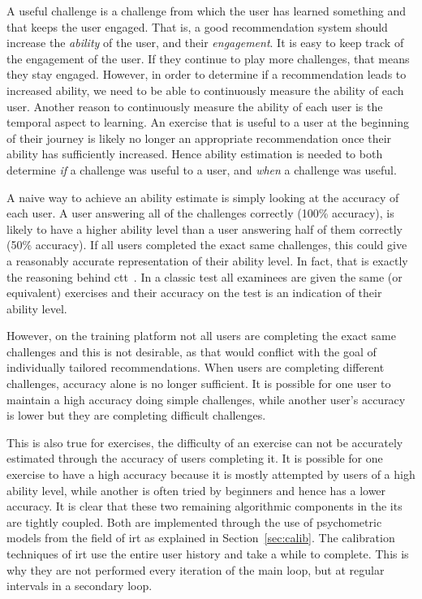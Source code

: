 A useful challenge is a challenge from which the user has learned something and that keeps the user engaged.
That is, a good recommendation system should increase the \textit{ability} of the user, and their \textit{engagement}.
It is easy to keep track of the engagement of the user.
If they continue to play more challenges, that means they stay engaged.
However, in order to determine if a recommendation leads to increased ability, we need to be able to continuously measure the ability of each user.
Another reason to continuously measure the ability of each user is the temporal aspect to learning.
An exercise that is useful to a user at the beginning of their journey is likely no longer an appropriate recommendation once their ability has sufficiently increased.
Hence ability estimation is needed to both determine \textit{if} a challenge was useful to a user, and \textit{when} a challenge was useful.

A naive way to achieve an ability estimate is simply looking at the accuracy of each user.
A user answering all of the challenges correctly (100\% accuracy), is likely to have a higher ability level than a user answering half of them correctly (50\% accuracy).
If all users completed the exact same challenges, this could give a reasonably accurate representation of their ability level.
In fact, that is exactly the reasoning behind \gls{ctt}~\cite{ctt}.
In a classic test all examinees are given the same (or equivalent) exercises and their accuracy on the test is an indication of their ability level.

However, on the training platform not all users are completing the exact same challenges and this is not desirable, as that would conflict with the goal of individually tailored recommendations.
When users are completing different challenges, accuracy alone is no longer sufficient.
It is possible for one user to maintain a high accuracy doing simple challenges, while another user's accuracy is lower but they are completing difficult challenges.

This is also true for exercises, the difficulty of an exercise can not be accurately estimated through the accuracy of users completing it.
It is possible for one exercise to have a high accuracy because it is mostly attempted by users of a high ability level, while another is often tried by beginners and hence has a lower accuracy.
It is clear that these two remaining algorithmic components in the \gls{its} are tightly coupled.
Both are implemented through the use of psychometric models from the field of \gls{irt} as explained in Section~\ref{sec:calib}.
The calibration techniques of \gls{irt} use the entire user history and take a while to complete.
This is why they are not performed every iteration of the main loop, but at regular intervals in a secondary loop.
